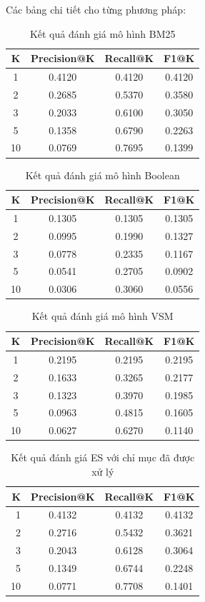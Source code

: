 \documentclass[../BTL.tex]{subfiles}
\begin{document}
Các bảng chi tiết cho từng phương pháp:

\begin{table}[H]
\centering
\begin{tabular}{c c c c}
\hline
K & Precision@K & Recall@K & F1@K \\
\hline
1  & 0.4120 & 0.4120 & 0.4120 \\
2  & 0.2685 & 0.5370 & 0.3580 \\
3  & 0.2033 & 0.6100 & 0.3050 \\
5  & 0.1358 & 0.6790 & 0.2263 \\
10 & 0.0769 & 0.7695 & 0.1399 \\
\hline
\end{tabular}
\caption{Kết quả đánh giá mô hình BM25}
\end{table}

\begin{table}[H]
\centering
\begin{tabular}{c c c c}
\hline
K & Precision@K & Recall@K & F1@K \\
\hline
1  & 0.1305 & 0.1305 & 0.1305 \\
2  & 0.0995 & 0.1990 & 0.1327 \\
3  & 0.0778 & 0.2335 & 0.1167 \\
5  & 0.0541 & 0.2705 & 0.0902 \\
10 & 0.0306 & 0.3060 & 0.0556 \\
\hline
\end{tabular}
\caption{Kết quả đánh giá mô hình Boolean}
\end{table}

\begin{table}[H]
\centering
\begin{tabular}{c c c c}
\hline
K & Precision@K & Recall@K & F1@K \\
\hline
1  & 0.2195 & 0.2195 & 0.2195 \\
2  & 0.1633 & 0.3265 & 0.2177 \\
3  & 0.1323 & 0.3970 & 0.1985 \\
5  & 0.0963 & 0.4815 & 0.1605 \\
10 & 0.0627 & 0.6270 & 0.1140 \\
\hline
\end{tabular}
\caption{Kết quả đánh giá mô hình VSM}
\end{table}

\begin{table}[H]
\centering
\begin{tabular}{rccc}
\hline
K & Precision@K & Recall@K & F1@K \\
\hline
1  & 0.4132 & 0.4132 & 0.4132 \\
2  & 0.2716 & 0.5432 & 0.3621 \\
3  & 0.2043 & 0.6128 & 0.3064 \\
5  & 0.1349 & 0.6744 & 0.2248 \\
10 & 0.0771 & 0.7708 & 0.1401 \\
\hline
\end{tabular}
\caption{Kết quả đánh giá ES với chỉ mục đã được xử lý}
\end{table}
\end{document}
